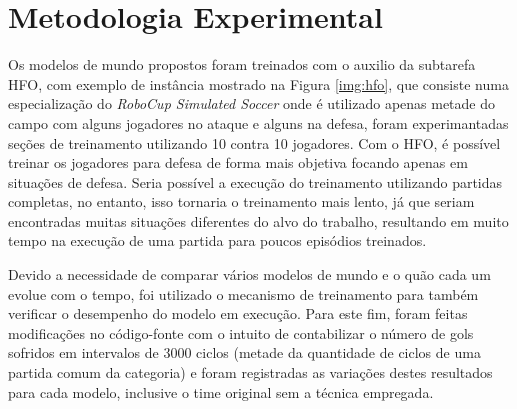 \section{Metodologia Experimental}\label{meotodologia}

Os modelos de mundo propostos foram treinados com o auxilio da subtarefa HFO,
com exemplo de instância mostrado na Figura \ref{img:hfo}, que consiste numa especialização do
\textit{RoboCup Simulated Soccer} onde é utilizado apenas metade do campo com
alguns jogadores no ataque e alguns na defesa, foram experimantadas seções de
treinamento utilizando 10 contra 10 jogadores. Com o HFO, é
possível treinar os jogadores para defesa de forma mais objetiva focando apenas
em situações de defesa. Seria possível a execução do treinamento utilizando
partidas completas, no entanto, isso tornaria o treinamento mais lento, já que
seriam encontradas muitas situações diferentes do alvo do trabalho,
resultando em muito tempo na execução de uma partida para poucos episódios
treinados.


Devido a necessidade de comparar vários modelos de mundo e o quão cada um evolue com o
tempo, foi utilizado o mecanismo de treinamento para também verificar o
desempenho do modelo em execução. Para este fim, foram feitas modificações no
código-fonte com o intuito de contabilizar o número de gols sofridos em
intervalos de 3000 ciclos (metade da quantidade de ciclos de uma partida comum
da categoria) e foram registradas as variações destes resultados para cada
modelo, inclusive o time original sem a técnica empregada.